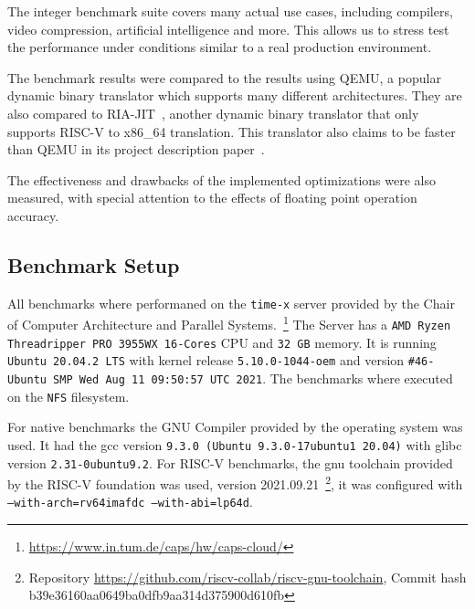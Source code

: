 \documentclass[course=eragp]{aspdoc}
\begin{document}
\par

The integer benchmark suite covers many actual use cases, including compilers,
video compression, artificial intelligence and more. This allows us to stress
test the performance under conditions similar to a real production environment.

\par

The benchmark results were compared to the results using QEMU, a popular dynamic
binary translator which supports many different architectures.
They are also compared to RIA-JIT~\cite{ria_jit_repo}, another dynamic binary translator that only
supports RISC-V to x86\_64 translation. This translator also claims to be faster
than QEMU in its project description paper~\cite{ria_jit_paper}.

\par

The effectiveness and drawbacks of the implemented optimizations were also measured,
with special attention to the effects of floating point operation accuracy.

\subsection{Benchmark Setup}

All benchmarks where performaned on the \texttt{time-x} server provided by the
Chair of Computer Architecture and Parallel Systems.~\footnote{\url{https://www.in.tum.de/caps/hw/caps-cloud/}} %
The Server has a \texttt{AMD Ryzen Threadripper PRO 3955WX 16-Cores} CPU and \texttt{32 GB} memory.
It is running \texttt{Ubuntu 20.04.2 LTS} with kernel release \texttt{5.10.0-1044-oem}
and version \texttt{\#46-Ubuntu SMP Wed Aug 11 09:50:57 UTC 2021}.
The benchmarks where executed on the \texttt{NFS} filesystem.

For native benchmarks the GNU Compiler provided by the operating system was used. It had the gcc
version \texttt{9.3.0 (Ubuntu 9.3.0-17ubuntu1~20.04)} with glibc version \texttt{2.31-0ubuntu9.2}.
For RISC-V benchmarks, the gnu toolchain provided by the RISC-V foundation was used,
version 2021.09.21~\footnote{Repository \url{https://github.com/riscv-collab/riscv-gnu-toolchain}, Commit hash b39e36160aa0649ba0dfb9aa314d375900d610fb},
it was configured with \texttt{--with-arch=rv64imafdc --with-abi=lp64d}.

\par
\end{document}
